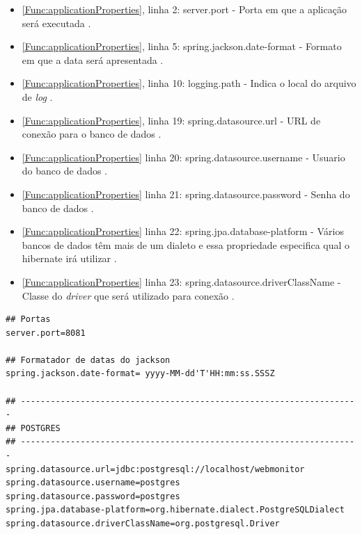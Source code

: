 \begin{itemize}
		\item \autoref{Func:applicationProperties}, linha 2: server.port - Porta em que a aplicação será executada \cite{springBoot:2017}.
		
		\item \autoref{Func:applicationProperties}, linha 5: spring.jackson.date-format - Formato em que a data será apresentada \cite{springBoot:2017}.
		
		\item \autoref{Func:applicationProperties}, linha 10: logging.path - Indica o local do arquivo de \textit{log} \cite{springBoot:2017}.
		
		\item \autoref{Func:applicationProperties}, linha 19: spring.datasource.url - URL de conexão para o banco de dados \cite{springBoot:2017}.
		
		\item \autoref{Func:applicationProperties} linha 20: spring.datasource.username - Usuario do banco de dados \cite{springBoot:2017}.
		
		\item \autoref{Func:applicationProperties} linha 21: spring.datasource.password - Senha do banco de dados \cite{springBoot:2017}.
		
		\item \autoref{Func:applicationProperties} linha 22: spring.jpa.database-platform - Vários bancos de dados têm mais de um dialeto e essa propriedade especifica qual o hibernate irá utilizar \cite{springBoot:2017}.
		
		\item \autoref{Func:applicationProperties} linha 23: spring.datasource.driverClassName - Classe do \textit{driver} que será utilizado para conexão \cite{springBoot:2017}.
		
\end{itemize}

\begin{lstlisting}[style=LIVRE, label=Func:applicationProperties,caption={[Arquivo application.properties com as principais configurações do projeto.]Arquivo application.properties com as principais configurações do projeto.}]
## Portas
server.port=8081

## Formatador de datas do jackson
spring.jackson.date-format= yyyy-MM-dd'T'HH:mm:ss.SSSZ

## --------------------------------------------------------------------
## POSTGRES
## --------------------------------------------------------------------
spring.datasource.url=jdbc:postgresql://localhost/webmonitor
spring.datasource.username=postgres
spring.datasource.password=postgres
spring.jpa.database-platform=org.hibernate.dialect.PostgreSQLDialect
spring.datasource.driverClassName=org.postgresql.Driver

\end{lstlisting}


